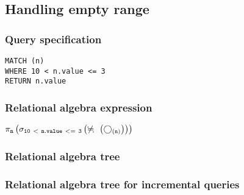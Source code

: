 \subsection{Handling empty range}

\subsubsection*{Query specification}

\begin{lstlisting}
MATCH (n)
WHERE 10 < n.value <= 3
RETURN n.value
\end{lstlisting}

\subsubsection*{Relational algebra expression}

$\projection{\var{n}} \left(\selection{\mathtt{10~<~n.value~<=~3}} \left(\alldifferent{} \left(\getvertices{n}{}\right)\right)\right)$

\subsubsection*{Relational algebra tree}


\subsubsection*{Relational algebra tree for incremental queries}


